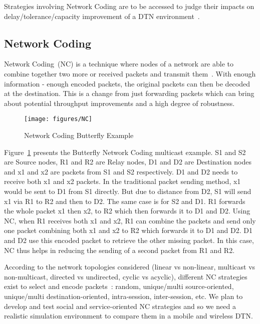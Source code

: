\documentclass[a4paper,twoside]{article}
\begin{document}
Strategies involving Network Coding are to be accessed to judge their impacts on delay/tolerance/capacity improvement of a DTN environment~\cite{Zhang06, 4509805, Altman:2010:DCC:1833515.1833540}.

\subsection{Network Coding}

Network Coding~(NC) is a technique where nodes of a network are able to combine together two more or received packets and transmit them~\cite{Fragouli:2006:NCI:1111322.1111337}. With enough information - enough encoded packets, the original packets can then be decoded at the destination. This is a change from just forwarding packets which can bring about potential throughput improvements and a high degree of robustness.

\begin{figure}[!hbt]
\centering
\texttt{[image: figures/NC]}
\caption{Network Coding Butterfly Example}
\label{fig:nc}
\end{figure}

Figure~\ref{fig:nc} presents the Butterfly Network Coding multicast example. S1 and S2 are Source nodes, R1 and R2 are Relay nodes, D1 and D2 are Destination nodes and x1 and x2 are packets from S1 and S2 respectively. D1 and D2 needs to receive both x1 and x2 packets. In the traditional packet sending method, x1 would be sent to D1 from S1 directly. But due to distance from D2, S1 will send x1 via R1 to R2 and then to D2. The same case is for S2 and D1. R1 forwards the whole packet x1 then x2, to R2 which then forwards it to D1 and D2. 
Using NC, when R1 receives both x1 and x2, R1 can combine the packets and send only one packet combining both x1 and x2 to R2 which forwards it to D1 and D2. D1 and D2 use this encoded packet to retrieve the other missing packet. In this case, NC thus helps in reducing the sending of a second packet from R1 and R2.

According to the network topologies considered (linear vs non-linear, multicast vs non-multicast, directed vs undirected, cyclic vs acyclic), different NC strategies exist to select and encode packets~\cite{katti2005}: random, unique/multi source-oriented, unique/multi destination-oriented, intra-session, inter-session, etc. We plan to develop and test social and service-oriented NC strategies and so we need a realistic simulation environment to compare them in a mobile and wireless DTN.
\end{document}

